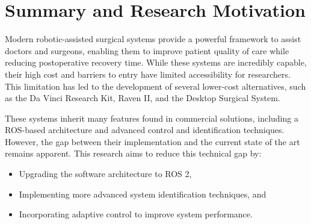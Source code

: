 \section{Summary and Research Motivation}

Modern robotic-assisted surgical systems provide a powerful framework to assist doctors and surgeons, enabling them to improve patient quality of care while reducing postoperative recovery time. While these systems are incredibly capable, their high cost and barriers to entry have limited accessibility for researchers. This limitation has led to the development of several lower-cost alternatives, such as the Da Vinci Research Kit, Raven II, and the Desktop Surgical System.

These systems inherit many features found in commercial solutions, including a ROS-based architecture and advanced control and identification techniques. However, the gap between their implementation and the current state of the art remains apparent. This research aims to reduce this technical gap by:
\begin{itemize}
    \item Upgrading the software architecture to ROS 2,
    \item Implementing more advanced system identification techniques, and
    \item Incorporating adaptive control to improve system performance.
\end{itemize}